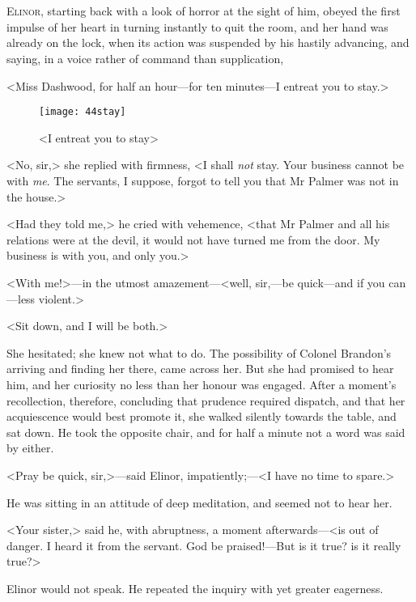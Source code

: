 \chapter[Chapter \thechapter]{}
\lettrine[lraise=0.3]{E}{linor}, starting back with a look of horror at the sight of him, obeyed the first impulse of her heart in turning instantly to quit the room, and her hand was already on the lock, when its action was suspended by his hastily advancing, and saying, in a voice rather of command than supplication,

<Miss Dashwood, for half an hour—for ten minutes—I entreat you to stay.>

\begin{figure}[tbph]
\centering
\texttt{[image: 44stay]}
\caption{<I entreat you to stay>}
\end{figure}

<No, sir,> she replied with firmness, <I shall \textit{not} stay. Your business cannot be with \textit{me}. The servants, I suppose, forgot to tell you that Mr Palmer was not in the house.>

<Had they told me,> he cried with vehemence, <that Mr Palmer and all his relations were at the devil, it would not have turned me from the door. My business is with you, and only you.>

<With me!>—in the utmost amazement—<well, sir,—be quick—and if you can—less violent.>

<Sit down, and I will be both.>

She hesitated; she knew not what to do. The possibility of Colonel Brandon's arriving and finding her there, came across her. But she had promised to hear him, and her curiosity no less than her honour was engaged. After a moment's recollection, therefore, concluding that prudence required dispatch, and that her acquiescence would best promote it, she walked silently towards the table, and sat down. He took the opposite chair, and for half a minute not a word was said by either.

<Pray be quick, sir,>—said Elinor, impatiently;—<I have no time to spare.>

He was sitting in an attitude of deep meditation, and seemed not to hear her.

<Your sister,> said he, with abruptness, a moment afterwards—<is out of danger. I heard it from the servant. God be praised!—But is it true? is it really true?>

Elinor would not speak. He repeated the inquiry with yet greater eagerness.

